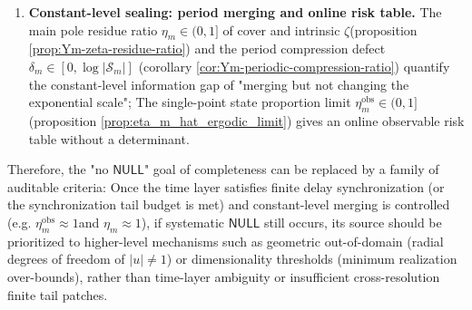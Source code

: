 \begin{remark}
\begin{enumerate}
  \item ​​\textbf{Constant-level sealing: period merging and online risk table. }
  The main pole residue ratio \(\eta_m\in(0,1]\) of cover and intrinsic \(\zeta\) ​​(proposition \ref{prop:Ym-zeta-residue-ratio}) and the period compression defect \(\delta_m\in[0,\log|\mathcal{S}_m|]\) (corollary \ref{cor:Ym-periodic-compression-ratio}) quantify the constant-level information gap of "merging but not changing the exponential scale";
  The single-point state proportion limit \(\eta_m^{\mathrm{obs}}\in(0,1]\) ​​(proposition \ref{prop:eta_m_hat_ergodic_limit}) gives an online observable risk table without a determinant.
\end{enumerate}
\par
Therefore, the "no \(\mathsf{NULL}\)" goal of completeness can be replaced by a family of auditable criteria:
Once the time layer satisfies finite delay synchronization (or the synchronization tail budget is met) and constant-level merging is controlled (e.g. \(\eta_m^{\mathrm{obs}}\approx 1\) ​​and \(\eta_m\approx 1\)), if systematic \(\mathsf{NULL}\) still occurs, its source should be prioritized to higher-level mechanisms such as geometric out-of-domain (radial degrees of freedom of \(|u|\neq 1\)) or dimensionality thresholds (minimum realization over-bounds), rather than time-layer ambiguity or insufficient cross-resolution finite tail patches.
\end{remark}

